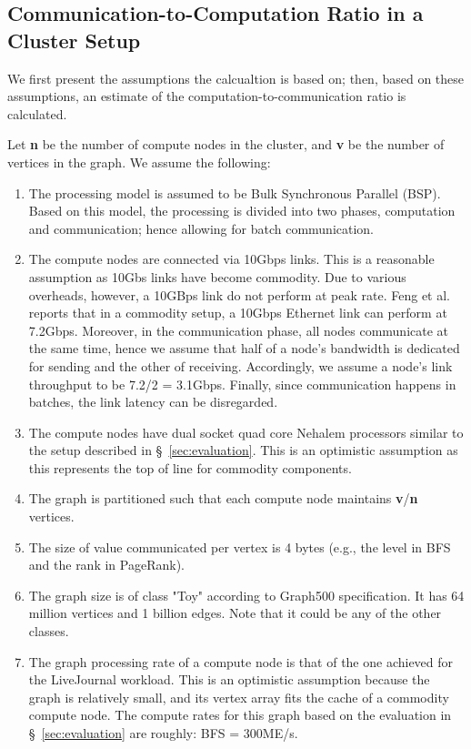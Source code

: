 \subsection{Communication-to-Computation Ratio in a Cluster Setup}
\label{sec:model}
We first present the assumptions the calcualtion is based on; then, based on these assumptions, an estimate of the computation-to-communication ratio is calculated. 

Let {\bf n} be the number of compute nodes in the cluster, and {\bf v} be the number of vertices in the graph. We assume the following: 

\begin{enumerate}
\item The processing model is assumed to be Bulk Synchronous Parallel (BSP). Based on this model, the processing is divided into two phases, computation and communication; hence allowing for batch communication.

\item The compute nodes are connected via 10Gbps links. This is a reasonable assumption as 10Gbs links have become commodity. Due to various overheads, however, a 10GBps link do not perform at peak rate. Feng et al. \cite{Feng2003} reports that in a commodity setup, a 10Gbps Ethernet link can perform at 7.2Gbps. Moreover, in the communication phase, all nodes communicate at the same time, hence we assume that half of a node's bandwidth is dedicated for sending and the other of receiving. Accordingly, we assume a node's link throughput to be 7.2/2 = 3.1Gbps. Finally, since communication happens in batches, the link latency can be disregarded.

\item The compute nodes have dual socket quad core Nehalem processors similar to the setup described in \S~\ref{sec:evaluation}. This is an optimistic assumption as this represents the top of line for commodity components.

\item The graph is partitioned such that each compute node maintains {\bf v}/{\bf n} vertices.

\item The size of value communicated per vertex is 4 bytes (e.g., the level in BFS and the rank in PageRank).

\item The graph size is of class "Toy" according to Graph500 specification. It has 64 million vertices and 1 billion edges. Note that it could be any of the other classes.

\item The graph processing rate of a compute node is that of the one achieved for the LiveJournal workload. This is an optimistic assumption because the graph is relatively small, and its vertex array fits the cache of a commodity compute node. The compute rates for this graph based on the evaluation in \S~\ref{sec:evaluation} are roughly: BFS = 300ME/s.
\end{enumerate}


